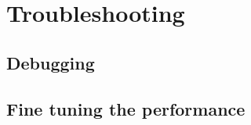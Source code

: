 \section{Troubleshooting}
\TODO{}

\subsection{Debugging}
\subsection{Fine tuning the performance}

